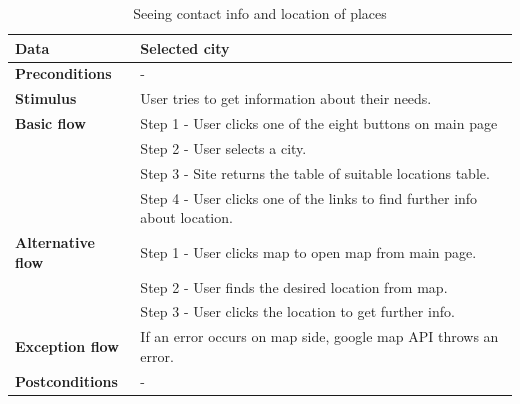 \begin{center}
\begin{table}[H]
\begin{tabular}{| m{3cm}| m{10cm} |}
            \hline
            \textbf{Data} & Selected city\\
            \hline
            \textbf{Preconditions} & - \\
            \hline
            \textbf{Stimulus} & User tries to get information about their needs. \\
            \hline
            \textbf{Basic flow} & Step 1 - User clicks one of the eight buttons on main page\\
                                & Step 2 - User selects a city.\\
                                & Step 3 - Site returns the table of suitable locations table.\\
                                & Step 4 - User clicks one of the links to find further info about location. \\
            \hline
            \textbf{Alternative flow} & Step 1 - User clicks map to open map from main page.\\
                                & Step 2 - User finds the desired location from map.\\
                                & Step 3 - User clicks the location to get further info. \\
            \hline
            \textbf{Exception flow} & If an error occurs on map side, google map API throws an error.\\
            \hline
            \textbf{Postconditions} & -\\
            \hline
        \end{tabular}
        \caption[Contact info and location]{Seeing contact info and location of places}
    \end{table}
    
    ~\\~\\~\\
    

\end{center}
